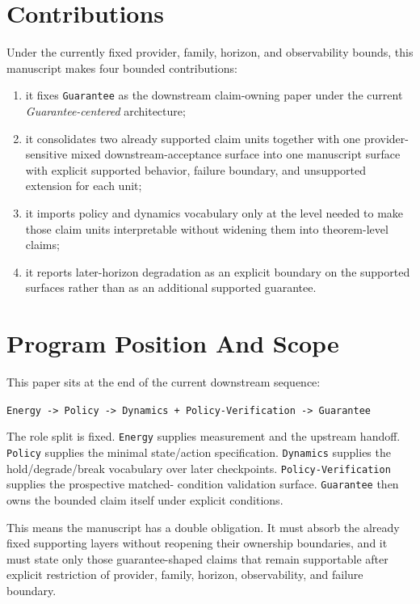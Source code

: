 \documentclass[11pt]{article}
\begin{document}
\section{Contributions}

Under the currently fixed provider, family, horizon, and observability bounds,
this manuscript makes four bounded contributions:

\begin{enumerate}
\item it fixes \texttt{Guarantee} as the downstream claim-owning paper under the
current \textit{Guarantee-centered} architecture;
\item it consolidates two already supported claim units together with one
provider-sensitive mixed downstream-acceptance surface into one manuscript
surface with explicit supported behavior, failure boundary, and unsupported
extension for each unit;
\item it imports policy and dynamics vocabulary only at the level needed to make
those claim units interpretable without widening them into theorem-level claims;
\item it reports later-horizon degradation as an explicit boundary on the
supported surfaces rather than as an additional supported guarantee.
\end{enumerate}

\section{Program Position And Scope}

This paper sits at the end of the current downstream sequence:

\begin{center}
\texttt{Energy -> Policy -> Dynamics + Policy-Verification -> Guarantee}
\end{center}

\noindent The role split is fixed. \texttt{Energy} supplies measurement and the
upstream handoff. \texttt{Policy} supplies the minimal state/action
specification. \texttt{Dynamics} supplies the hold/degrade/break vocabulary over
later checkpoints. \texttt{Policy-Verification} supplies the prospective matched-
condition validation surface. \texttt{Guarantee} then owns the bounded claim
itself under explicit conditions.

This means the manuscript has a double obligation. It must absorb the already
fixed supporting layers without reopening their ownership boundaries, and it must
state only those guarantee-shaped claims that remain supportable after explicit
restriction of provider, family, horizon, observability, and failure boundary.
\end{document}
